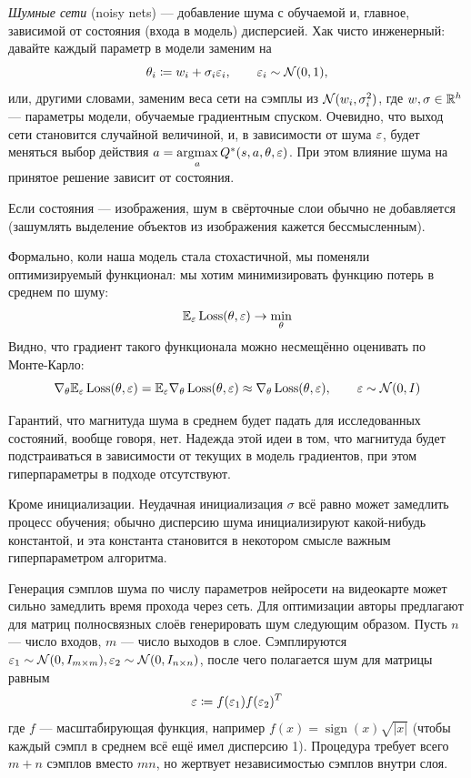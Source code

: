 \emph{Шумные сети} (noisy nets) --- добавление шума с обучаемой и, главное, зависимой от состояния (входа в модель) дисперсией. Хак чисто инженерный: давайте каждый параметр в модели заменим на
$$\theta_i \coloneqq w_i + \sigma_i \varepsilon_i, \qquad \varepsilon_i \sim \mathcal{N}(0, 1),$$
или, другими словами, заменим веса сети на сэмплы из $\mathcal{N}(w_i, \sigma^2_i)$, где $w, \sigma \in \mathbb{R}^h$ --- параметры модели, обучаемые градиентным спуском. Очевидно, что выход сети становится случайной величиной, и, в зависимости от шума $\varepsilon$, будет меняться выбор действия $a \HM= \argmax\limits_a Q^*(s, a, \theta, \eps)$. При этом влияние шума на принятое решение зависит от состояния.

\begin{remark}
Если состояния --- изображения, шум в свёрточные слои обычно не добавляется (зашумлять выделение объектов из изображения кажется бессмысленным).
\end{remark}

Формально, коли наша модель стала стохастичной, мы поменяли оптимизируемый функционал: мы хотим минимизировать функцию потерь в среднем по шуму:
$$\mathbb{E}_{\varepsilon} \operatorname{Loss}(\theta, \varepsilon) \to \min_\theta$$
Видно, что градиент такого функционала можно несмещённо оценивать по Монте-Карло:
$$\nabla_\theta \mathbb{E}_{\varepsilon} \operatorname{Loss}(\theta, \varepsilon) = \mathbb{E}_{\varepsilon} \nabla_\theta \operatorname{Loss}(\theta, \varepsilon) \approx \nabla_\theta \operatorname{Loss}(\theta, \varepsilon), \qquad \varepsilon \sim \mathcal{N}(0, I)$$

Гарантий, что магнитуда шума в среднем будет падать для исследованных состояний, вообще говоря, нет. Надежда этой идеи в том, что магнитуда будет подстраиваться в зависимости от текущих в модель градиентов, при этом гиперпараметры в подходе отсутствуют.
\begin{remark}
Кроме инициализации. Неудачная инициализация $\sigma$ всё равно может замедлить процесс обучения; обычно дисперсию шума инициализируют какой-нибудь константой, и эта константа становится в некотором смысле важным гиперпараметром алгоритма.
\end{remark}

\begin{remark}
Генерация сэмплов шума по числу параметров нейросети на видеокарте может сильно замедлить время прохода через сеть. Для оптимизации авторы предлагают для матриц полносвязных слоёв генерировать шум следующим образом. Пусть $n$ --- число входов, $m$ --- число выходов в слое. Сэмплируются $\varepsilon_1 \sim \mathcal{N}(0, I_{m \times m}), \varepsilon_2 \sim \mathcal{N}(0, I_{n \times n})$, после чего полагается шум для матрицы равным
$$\varepsilon \coloneqq f(\varepsilon_1) f(\varepsilon_2)^T$$
где $f$ --- масштабирующая функция, например $f(x) = \operatorname{sign}(x)\sqrt{|x|}$ (чтобы каждый сэмпл в среднем всё ещё имел дисперсию 1). Процедура требует всего $m + n$ сэмплов вместо $mn$, но жертвует независимостью сэмплов внутри слоя.
\end{remark}

